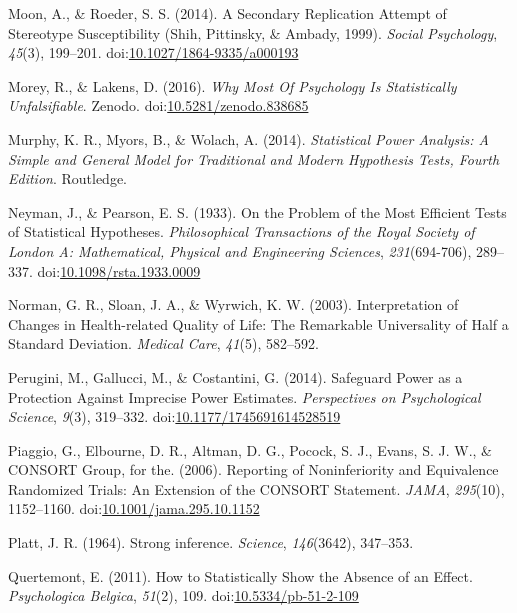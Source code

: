 \documentclass[english,floatsintext,man]{apa6}
\theoremstyle{definition}
\theoremstyle{definition}
\theoremstyle{definition}
\theoremstyle{remark}
\begin{document}
\hypertarget{ref-Moon2014}{}
Moon, A., \& Roeder, S. S. (2014). A Secondary Replication Attempt of
Stereotype Susceptibility (Shih, Pittinsky, \& Ambady, 1999).
\emph{Social Psychology}, \emph{45}(3), 199--201.
doi:\href{https://doi.org/10.1027/1864-9335/a000193}{10.1027/1864-9335/a000193}

\hypertarget{ref-Morey2016}{}
Morey, R., \& Lakens, D. (2016). \emph{Why Most Of Psychology Is
Statistically Unfalsifiable}. Zenodo.
doi:\href{https://doi.org/10.5281/zenodo.838685}{10.5281/zenodo.838685}

\hypertarget{ref-Murphy2014}{}
Murphy, K. R., Myors, B., \& Wolach, A. (2014). \emph{Statistical Power
Analysis: A Simple and General Model for Traditional and Modern
Hypothesis Tests, Fourth Edition}. Routledge.

\hypertarget{ref-Neyman1933}{}
Neyman, J., \& Pearson, E. S. (1933). On the Problem of the Most
Efficient Tests of Statistical Hypotheses. \emph{Philosophical
Transactions of the Royal Society of London A: Mathematical, Physical
and Engineering Sciences}, \emph{231}(694-706), 289--337.
doi:\href{https://doi.org/10.1098/rsta.1933.0009}{10.1098/rsta.1933.0009}

\hypertarget{ref-Norman2003}{}
Norman, G. R., Sloan, J. A., \& Wyrwich, K. W. (2003). Interpretation of
Changes in Health-related Quality of Life: The Remarkable Universality
of Half a Standard Deviation. \emph{Medical Care}, \emph{41}(5),
582--592.

\hypertarget{ref-Perugini2014}{}
Perugini, M., Gallucci, M., \& Costantini, G. (2014). Safeguard Power as
a Protection Against Imprecise Power Estimates. \emph{Perspectives on
Psychological Science}, \emph{9}(3), 319--332.
doi:\href{https://doi.org/10.1177/1745691614528519}{10.1177/1745691614528519}

\hypertarget{ref-Piaggio2006}{}
Piaggio, G., Elbourne, D. R., Altman, D. G., Pocock, S. J., Evans, S. J.
W., \& CONSORT Group, for the. (2006). Reporting of Noninferiority and
Equivalence Randomized Trials: An Extension of the CONSORT Statement.
\emph{JAMA}, \emph{295}(10), 1152--1160.
doi:\href{https://doi.org/10.1001/jama.295.10.1152}{10.1001/jama.295.10.1152}

\hypertarget{ref-Platt1964}{}
Platt, J. R. (1964). Strong inference. \emph{Science}, \emph{146}(3642),
347--353.

\hypertarget{ref-Quertemont2011}{}
Quertemont, E. (2011). How to Statistically Show the Absence of an
Effect. \emph{Psychologica Belgica}, \emph{51}(2), 109.
doi:\href{https://doi.org/10.5334/pb-51-2-109}{10.5334/pb-51-2-109}
\end{document}
